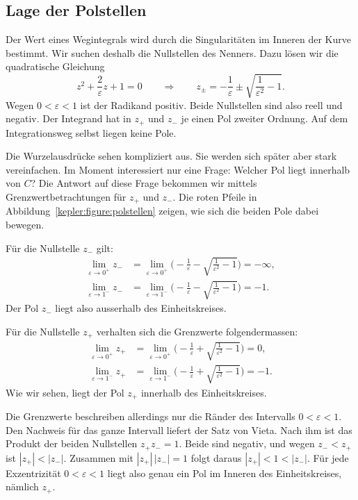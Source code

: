 \subsection{Lage der Polstellen
\label{kepler:subsection:polstellen}}



Der Wert eines Wegintegrals wird durch die Singularitäten im Inneren der Kurve bestimmt.
Wir suchen deshalb die Nullstellen des Nenners.
%
Dazu lösen wir die quadratische Gleichung
\[
z^2+\frac{2}{\varepsilon}z+1
=
0
\qquad\Rightarrow\qquad
z_{\pm}
=
-\frac{1}{\varepsilon}\pm\!\sqrt{\frac{1}{\varepsilon^2}-1}.
\]
Wegen $0<\varepsilon<1$ ist der Radikand positiv.
Beide Nullstellen sind also reell und negativ.
Der Integrand hat in $z_+$ und $z_-$ je einen Pol zweiter Ordnung.
Auf dem Integrationsweg selbst liegen keine Pole.

Die Wurzelausdrücke sehen kompliziert aus.
Sie werden sich später aber stark vereinfachen.
Im Moment interessiert nur eine Frage: Welcher Pol liegt innerhalb von $C$?
Die Antwort auf diese Frage bekommen wir mittels Grenzwertbetrachtungen für $z_+$ und $z_-$.
Die roten Pfeile in Abbildung~\ref{kepler:figure:polstellen} zeigen, wie sich die beiden Pole dabei bewegen.

Für die Nullstelle $z_-$ gilt:
\begin{align*}
\lim_{\varepsilon \to 0^+} z_- &= \lim_{\varepsilon \to 0^+} \biggl(-\frac{1}{\varepsilon}-\!\sqrt{\frac{1}{\varepsilon^2}-1}\biggr) = -\infty, \\
\lim_{\varepsilon \to 1^-} z_- &= \lim_{\varepsilon \to 1^-} \biggl(-\frac{1}{\varepsilon}-\!\sqrt{\frac{1}{\varepsilon^2}-1}\biggr) = -1.
\end{align*}
Der Pol $z_-$ liegt also ausserhalb des Einheitskreises.

Für die Nullstelle $z_+$ verhalten sich die Grenzwerte folgendermassen:
\begin{align*}
\lim_{\varepsilon \to 0^+} z_+ &= \lim_{\varepsilon \to 0^+} \biggl(-\frac{1}{\varepsilon}+\!\sqrt{\frac{1}{\varepsilon^2}-1}\biggr) = 0, \\
\lim_{\varepsilon \to 1^-} z_+ &= \lim_{\varepsilon \to 1^-} \biggl(-\frac{1}{\varepsilon}+\!\sqrt{\frac{1}{\varepsilon^2}-1}\biggr) = -1.
\end{align*}
Wie wir sehen, liegt der Pol $z_+$ innerhalb des Einheitskreises.

Die Grenzwerte beschreiben allerdings nur die Ränder des Intervalls $0<\varepsilon<1$.
Den Nachweis für das ganze Intervall liefert der Satz von Vieta.
Nach ihm ist das Produkt der beiden Nullstellen $z_+z_-=1$.
Beide sind negativ, und wegen $z_-<z_+$ ist $|z_+|<|z_-|$.
Zusammen mit $|z_+|\,|z_-|=1$ folgt daraus $|z_+|<1<|z_-|$.
Für jede Exzentrizität $0<\varepsilon<1$ liegt also genau ein Pol im Inneren des Einheitskreises, nämlich $z_+$.

